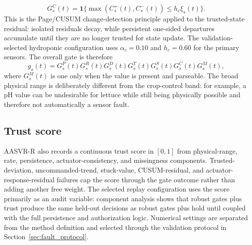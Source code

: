 \documentclass[preprint,12pt,doubleblind]{elsarticle}
\begin{document}
\begin{equation}
G^C_s(t)=\mathbf{1}\{\max(C_s^+(t),C_s^-(t))\le h_c\xi_s(t)\}.
\end{equation}
This is the Page/CUSUM change-detection principle applied to the trusted-state residual: isolated residuals decay, while persistent one-sided departures accumulate until they are no longer trusted for state update. The validation-selected hydroponic configuration uses $\alpha_c=0.10$ and $h_c=0.60$ for the primary sensors. The overall gate is therefore
\begin{equation}
g_s(t)=G^{P}_s(t)G^{R}_s(t)G^{D}_s(t)G^{T}_s(t)G^{S}_s(t)G^C_s(t)G^{M}_s(t),
\end{equation}
where $G^{M}_s(t)$ is one only when the value is present and parseable. The broad physical range is deliberately different from the crop-control band: for example, a pH value can be undesirable for lettuce while still being physically possible and therefore not automatically a sensor fault.

\subsection{Trust score}
AASVR-R also records a continuous trust score in $[0,1]$ from physical-range, rate, persistence, actuator-consistency, and missingness components. Trusted-deviation, uncommanded-trend, stuck-value, CUSUM-residual, and actuator-response-residual failures cap the score through the gate outcome rather than adding another free weight. The selected replay configuration uses the score primarily as an audit variable: component analysis shows that robust gates plus trust produce the same held-out decisions as robust gates plus hold until coupled with the full persistence and authorization logic. Numerical settings are separated from the method definition and selected through the validation protocol in Section~\ref{sec:fault_protocol}.
\end{document}
